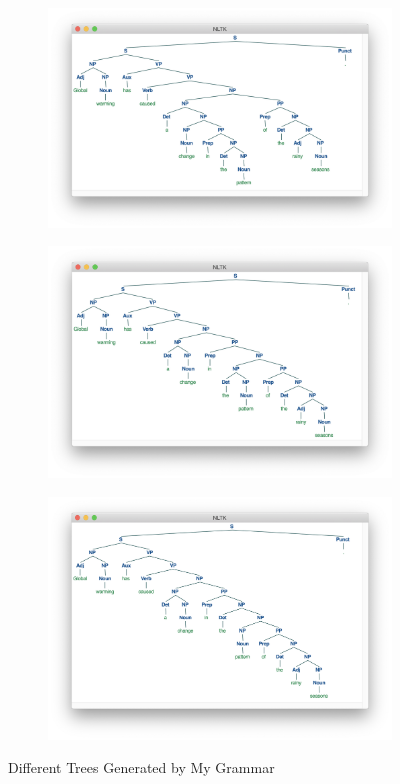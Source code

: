 \documentclass[11pt]{article} %
\begin{document}
\begin{figure}[p]
  \begin{subfigure}{0.45\textwidth}
    \includegraphics[width=0.9\linewidth]{images/figure_cfg_tree_5.png}
    \caption{}
  \end{subfigure}
  \begin{subfigure}{0.45\textwidth}
    \includegraphics[width=0.9\linewidth]{images/figure_cfg_tree_6.png}
    \caption{}
  \end{subfigure}

  \begin{subfigure}{0.45\textwidth}
    \centering
    \includegraphics[width=0.9\linewidth]{images/figure_cfg_tree_7.png}
    \caption{}
  \end{subfigure}

  \caption{Different Trees Generated by My Grammar}
  \label{fig2:cfgtrees}
\end{figure}
\end{document}
